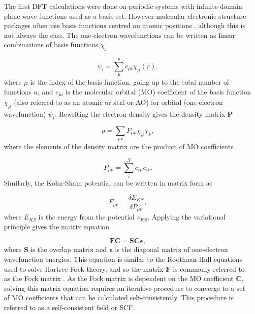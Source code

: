 The first DFT calculations were done on periodic systems with infinite-domain plane
wave functions used as a basis set. However molecular electronic structure packages
often use basis functions centred on atomic positions \cite{Boys1950}, although 
this is not always the case. The one-electron wavefunctions can be written as linear
combinations of basis functions $\chi_j$

\begin{equation}
    \psi_i = \sum_\mu^n c_{\mu i} \chi_\mu \left( r\right),
\end{equation}
%
where $\mu$ is the index of the basis function, going up to the total number of functions
$n$, and $c_{\mu i}$ is the molecular orbital (MO) coefficient of the basis function
$\chi_\mu$ (also referred to as an atomic orbital or AO) for orbital (one-electron 
wavefunction) $\psi_i$. Rewriting the electron density gives the density matrix 
$\mathbf{P}$

\begin{equation}
    \rho = \sum_{\mu\nu} P_{\mu\nu} \chi_\mu \chi_\nu,
\end{equation}
%
where the elements of the density matrix are the product of MO coefficients

\begin{equation}
    P_{\mu\nu} = \sum_i^N c_{i \mu} c_{i \nu}.
\end{equation}
%
Similarly, the Kohn-Sham potential can be written in matrix form as

\begin{equation}
    F_{\mu \nu} = \frac{\delta E_{KS}}{\delta P_{\mu\nu}},
\end{equation}
%
where $E_{KS}$ is the energy from the potential $v_{KS}$. Applying the variational
principle gives the matrix equation

\begin{equation}
    \mathbf{F} \mathbf{C} = \mathbf{S} \mathbf{C} \mathbf{\epsilon},
\end{equation}
%
where $\mathbf{S}$ is the overlap matrix and $\mathbf{\epsilon}$ is the diagonal 
matrix of one-electron wavefunction energies. This equation is similar to the
Roothaan-Hall equations used to solve Hartree-Fock theory, and so the matrix $\mathbf{F}$
is commonly referred to as the Fock matrix \cite{Roothaan1951}. As the Fock matrix
is dependent on the MO coefficient $\mathbf{C}$, solving this matrix equation requires
an iterative procedure to converge to a set of MO coefficients that can be calculated
self-consistently. This procedure is referred to as a self-consistent field or SCF.

